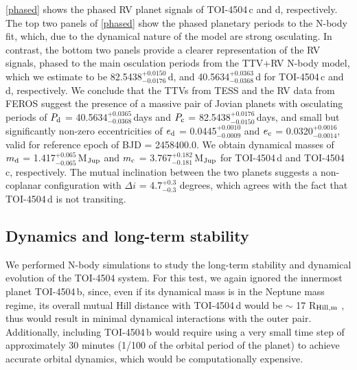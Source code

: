 \documentclass[twocolumn,twocolappendix]{aastex631}
\let\orgautoref\autoref
\renewcommand{\autoref}
        {\def\equationautorefname{Eq.}%
         \def\figureautorefname{Fig.}%
         \def\sectionautorefname{Sect.}%
         \def\subsectionautorefname{Sect.}%
         \def\subsubsectionautorefname{Sect.}%
         \orgautoref}
\begin{document}
\autoref{phased} shows the phased RV planet signals of TOI-4504\,c and d, respectively.
The top two panels of \autoref{phased} show the phased planetary periods to the N-body fit, which, due to the dynamical nature of the model are strong osculating. In contrast, the bottom two panels provide a clearer representation of the RV signals, phased to the main osculation periods from the TTV+RV N-body model, which we estimate to be 82.5438$_{-0.0176}^{+0.0150}$\,d, and 40.5634$_{-0.0368}^{+0.0363}$\,d for TOI-4504\,c and d, respectively.
We conclude that the TTVs from TESS and the RV data from FEROS suggest the presence of a massive pair of Jovian planets with osculating periods of $P_{\rm d}$ = 40.5634$_{-0.0368}^{+0.0365}$\,days and $P_{\rm c}$ = 82.5438$_{-0.0150}^{+0.0176}$\,days, and small but significantly non-zero eccentricities of $e_{\rm d}$ = 0.0445$_{-0.0009}^{+0.0010}$ and $e_{\rm c}$ = 0.0320$_{-0.0014}^{+0.0016}$, valid for reference epoch of BJD = 2458400.0. We obtain dynamical masses of $m_{\rm d}$ = 1.417$_{-0.065}^{+0.065}$\,M$_{\rm Jup}$ and $m_{\rm c}$ = 3.767$_{-0.181}^{+0.182}$\,M$_{\rm Jup}$ for TOI-4504\,d and TOI-4504\,c, respectively. The mutual inclination between the two planets suggests a non-coplanar configuration with $\Delta i$ = 4.7$_{-0.3}^{+0.3}$ degrees, which agrees with the fact that TOI-4504\,d is not transiting.

 

\subsection{Dynamics and long-term stability}
\label{sec4.3}


We performed N-body simulations to study the long-term stability 
and dynamical evolution of the TOI-4504 system. For this test, 
we again ignored the innermost planet TOI-4504\,b, since, even if its 
dynamical mass is in the Neptune mass regime, its overall mutual 
Hill distance with TOI-4504\,d would be $\sim$ 17 R$_{\rm Hill,m}$ \citep[see,][]{Gladman1993}, thus would result in minimal dynamical interactions with the outer pair. 
Additionally, including TOI-4504\,b would require using a very 
small time step of approximately 30 minutes (1/100 of the orbital period of the planet) to achieve accurate orbital dynamics, which would be computationally expensive.
\end{document}
